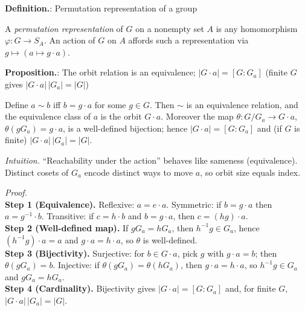 \documentclass[12pt]{article}
\theoremstyle{definition}
\begin{document}
\newpage


\noindent\textbf{Definition.}: Permutation representation of a group

\newpage

A \emph{permutation representation} of $G$ on a nonempty set $A$ is any homomorphism $\varphi:G\to S_A$. An action of $G$ on $A$ affords such a representation via $g\mapsto (a\mapsto g\cdot a)$.\\


\newpage


\noindent\textbf{Proposition.}: The orbit relation is an equivalence; $|G\cdot a|=[G:G_a]$ (finite $G$ gives $|G\cdot a|\,|G_a|=|G|$)

\newpage

Define $a\sim b$ iff $b=g\cdot a$ for some $g\in G$. Then $\sim$ is an equivalence relation, and the equivalence class of $a$ is the orbit $G\cdot a$. Moreover the map $\theta:G/G_a\to G\cdot a$, $\theta(gG_a)=g\cdot a$, is a well-defined bijection; hence $|G\cdot a|=[G:G_a]$ and (if $G$ is finite) $|G\cdot a|\,|G_a|=|G|$.\\

\dotfill

\emph{Intuition.} “Reachability under the action” behaves like sameness (equivalence). Distinct cosets of $G_a$ encode distinct ways to move $a$, so orbit size equals index.

\dotfill

\emph{Proof.}\\
\textbf{Step 1 (Equivalence).} Reflexive: $a=e\cdot a$. Symmetric: if $b=g\cdot a$ then $a=g^{-1}\cdot b$. Transitive: if $c=h\cdot b$ and $b=g\cdot a$, then $c=(hg)\cdot a$.\\
\textbf{Step 2 (Well-defined map).} If $gG_a=hG_a$, then $h^{-1}g\in G_a$, hence $(h^{-1}g)\cdot a=a$ and $g\cdot a=h\cdot a$, so $\theta$ is well-defined.\\
\textbf{Step 3 (Bijectivity).} Surjective: for $b\in G\cdot a$, pick $g$ with $g\cdot a=b$; then $\theta(gG_a)=b$. Injective: if $\theta(gG_a)=\theta(hG_a)$, then $g\cdot a=h\cdot a$, so $h^{-1}g\in G_a$ and $gG_a=hG_a$.\\
\textbf{Step 4 (Cardinality).} Bijectivity gives $|G\cdot a|=[G:G_a]$ and, for finite $G$, $|G\cdot a|\,|G_a|=|G|$.\\
\end{document}
